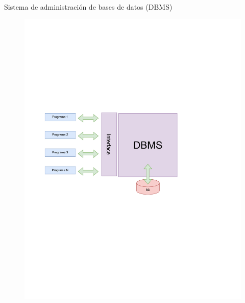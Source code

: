 \documentclass{beamer}
\begin{document}
\begin{frame}{Sistema de administración de bases de datos (DBMS)}
{\begin{figure}
    \includegraphics[scale=0.5]{img/file_systemdbms.pdf}
 \end{figure}
} 

  \end{frame} 
 
 
 
\end{document}
